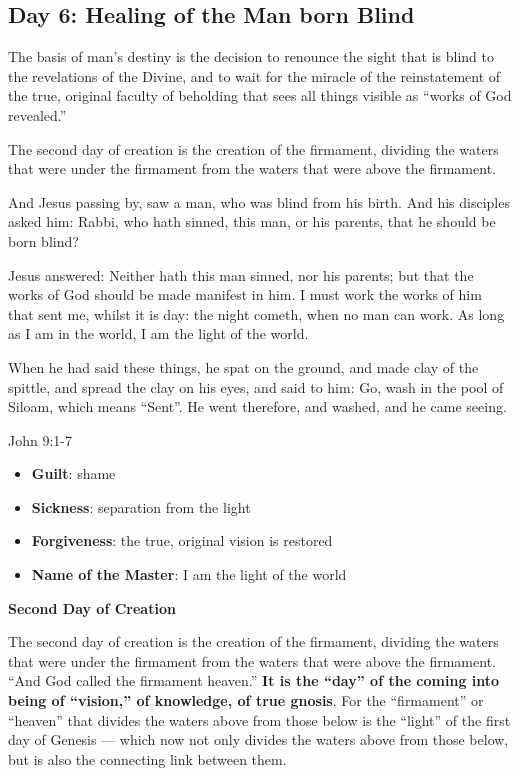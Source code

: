\subsection*{Day 6: Healing of the Man born Blind}
The basis of man's destiny is the decision to renounce the sight that is blind to the revelations
of the Divine, and to wait for the miracle of the reinstatement of the true, original faculty of beholding that sees
all things visible as “works of God revealed.”

The second day of creation is the creation of the firmament, dividing the waters that were under the firmament from the
waters that were above the firmament.

And Jesus passing by, saw a man, who was blind from his birth. And his disciples asked him: Rabbi, who hath sinned, this
man, or his parents, that he should be born blind?

Jesus answered: Neither hath this man sinned, nor his parents; but that the works of God should be made manifest in him.
I must work the works of him that sent me, whilst it is day: the night cometh, when no man can work. As long as I am in
the world, I am the light of the world.

When he had said these things, he spat on the ground, and made clay of the spittle, and spread the clay on his eyes, and
said to him: Go, wash in the pool of Siloam, which means “Sent”. He went therefore, and washed, and he came seeing.
\begin{flushright} John 9:1-7\end{flushright}

\begin{itemize}
\item \textbf{Guilt}: shame 
\item \textbf{Sickness}: separation from the light 
\item \textbf{Forgiveness}: the true, original vision is restored 
\item \textbf{Name of the Master}: I am the light of the world 
\end{itemize}
\textbf{Second Day of Creation}

The second day of creation is the creation of the firmament, dividing the waters that were under the firmament from the
waters that were above the firmament. “And God called the firmament heaven.” \textbf{It is the “day” of the coming into
being of “vision,” of knowledge, of true gnosis}. For the “firmament” or “heaven” that divides the waters above from
those below is the “light” of the first day of Genesis — which now not only divides the waters
above from those below, but is also the connecting link between them.


